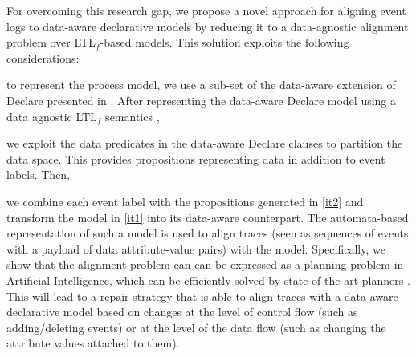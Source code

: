 
For overcoming this research gap, we propose a novel approach for aligning event logs to data-aware declarative models by reducing it to a data-agnostic alignment problem over LTL$_f$-based models. This solution exploits the following considerations: \begin{enumerate*}[label=\emph{\alph*})]
	\item \label{it1} to represent the process model, we use a sub-set of the data-aware extension of Declare presented in \cite{BurattinMS16}. After representing the data-aware Declare model using a data agnostic LTL$_f$ semantics \cite{10.1007/978-3-642-40176-3_8},
	\item \label{it2} we exploit the data predicates in the data-aware Declare clauses to partition the data space. This provides propositions representing data in addition to event labels. Then,
	\item we combine each event label with the propositions generated in \ref{it2} and transform the model in \ref{it1} into its data-aware counterpart. The automata-based representation of such a model is used to align traces (seen as sequences of events with a payload of data attribute-value pairs) with the model. Specifically, we show that the alignment problem can can be expressed as a planning problem in Artificial Intelligence, which can be efficiently solved by state-of-the-art planners \cite{XuLZ17a,Marrella17}.
%
This will lead to a repair strategy that is able to align traces with a data-aware declarative model based on changes at the level of control flow (such as adding/deleting events) or at the level of the data flow (such as changing the attribute values attached to them).
\end{enumerate*}

